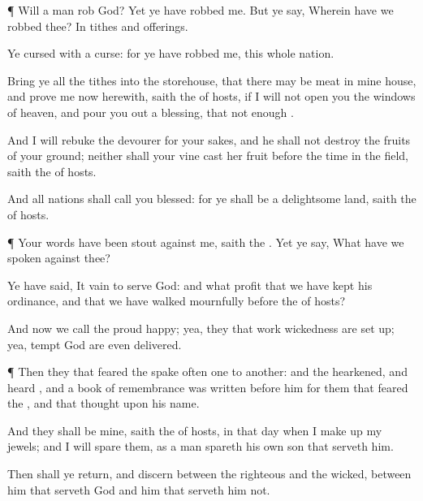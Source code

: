 {\par }{\PP {}¶ Will a
man
rob
God? Yet ye have
robbed me. But ye
say, Wherein have we
robbed thee? In
tithes and
offerings.

Ye
{}
cursed with a
curse: for ye have
robbed me,
{} this whole
nation.

Bring ye all the
tithes into the
storehouse, that there may be
meat in mine
house, and
prove me now
herewith,
saith the
{} of
hosts, if I will not
open you the
windows of
heaven, and pour you
out a
blessing, that
{} not
{}
enough
{}.

And I will
rebuke the
devourer for your sakes, and he shall not
destroy the
fruits of your
ground; neither shall your
vine cast her
fruit before the time in the
field,
saith the
{} of
hosts.

And all
nations shall call you
blessed: for ye shall be a
delightsome
land,
saith the
{} of
hosts.


\par }{\PP {}¶ Your
words have been
stout against me,
saith the
{}. Yet ye
say, What have we
spoken
{} against thee?

Ye have
said, It
{}
vain to
serve
God: and what
profit
{} that we have
kept his
ordinance, and that we have
walked
mournfully
before the
{} of
hosts?

And now we
call the
proud
happy; yea, they that
work
wickedness are set
up; yea,
{}
tempt
God are even
delivered.


\par }{\PP {}¶ Then they that
feared the
{} spake
often
one to
another: and the
{}
hearkened, and
heard
{}, and a
book of
remembrance was
written
before him for them that
feared the
{}, and that
thought upon his
name.

And they shall be mine,
saith the
{} of
hosts, in that
day when I make
up my
jewels; and I will
spare them, as a
man
spareth his own
son that
serveth him.

Then shall ye
return, and
discern between the
righteous and the
wicked, between him that
serveth
God and him that
serveth him not.




}
